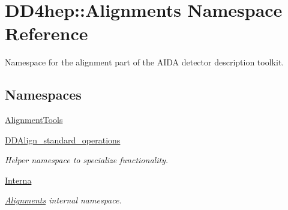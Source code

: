 \hypertarget{namespace_d_d4hep_1_1_alignments}{}\section{D\+D4hep\+:\+:Alignments Namespace Reference}
\label{namespace_d_d4hep_1_1_alignments}


Namespace for the alignment part of the A\+I\+DA detector description toolkit.  


\subsection*{Namespaces}
\begin{DoxyCompactItemize}
\item 
 \hyperlink{namespace_d_d4hep_1_1_alignments_1_1_alignment_tools}{Alignment\+Tools}
\item 
 \hyperlink{namespace_d_d4hep_1_1_alignments_1_1_d_d_align__standard__operations}{D\+D\+Align\+\_\+standard\+\_\+operations}
\begin{DoxyCompactList}\small\item\em Helper namespace to specialize functionality. \end{DoxyCompactList}\item 
 \hyperlink{namespace_d_d4hep_1_1_alignments_1_1_interna}{Interna}
\begin{DoxyCompactList}\small\item\em \hyperlink{namespace_d_d4hep_1_1_alignments}{Alignments} internal namespace. \end{DoxyCompactList}\end{DoxyCompactItemize}

